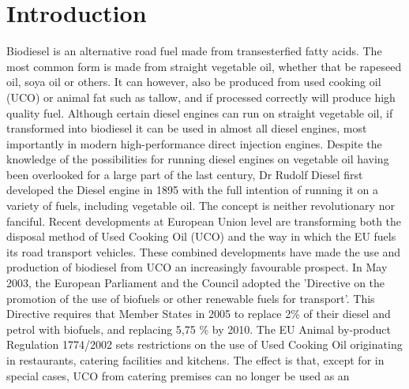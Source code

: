 \documentclass[11pt,fleqn]{book} %
\begin{document}



\chapter{Introduction}


Biodiesel is an alternative road fuel made from transesterfied fatty acids. The most common
form is made from straight vegetable oil, whether that be rapeseed oil, soya oil or others. It
can however, also be produced from used cooking oil (UCO) or animal fat such as tallow,
and if processed correctly will produce high quality fuel. Although certain diesel engines can
run on straight vegetable oil, if transformed into biodiesel it can be used in almost all diesel
engines, most importantly in modern high-performance direct injection engines.
Despite the knowledge of the possibilities for running diesel engines on vegetable oil having
been overlooked for a large part of the last century, Dr Rudolf Diesel first developed the
Diesel engine in 1895 with the full intention of running it on a variety of fuels, including
vegetable oil. The concept is neither revolutionary nor fanciful.
Recent developments at European Union level are transforming both the disposal method of
Used Cooking Oil (UCO) and the way in which the EU fuels its road transport vehicles.
These combined developments have made the use and production of biodiesel from UCO an
increasingly favourable prospect.
In May 2003, the European Parliament and the Council adopted the 'Directive on the
promotion of the use of biofuels or other renewable fuels for transport'. This Directive
requires that Member States in 2005 to replace 2\% of their diesel and petrol with biofuels,
and replacing 5,75 \% by 2010.
The EU Animal by-product Regulation 1774/2002 sets restrictions on the use of Used
Cooking Oil originating in restaurants, catering facilities and kitchens. The effect is that,
except for in special cases, UCO from catering premises can no longer be used as an
\end{document}
